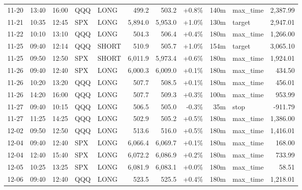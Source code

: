 \documentclass[11pt,a4paper,twoside]{article}
\begin{document}
\begin{center}
\begin{longtable}{>{\color{txtmain}}l l l l l r r r r >{\color{txtmain}}l r}
11-20 & 13:40 & 16:00 & QQQ & LONG & 499.2 & 503.2 & \textcolor{wingreen}{+0.8\%} & 140m & max\_time & \textcolor{wingreen}{2,387.99} \\
11-21 & 10:35 & 12:45 & SPX & LONG & 5,894.0 & 5,953.0 & \textcolor{wingreen}{+1.0\%} & 130m & target & \textcolor{wingreen}{2,947.01} \\
11-22 & 10:10 & 13:10 & QQQ & LONG & 504.3 & 506.4 & \textcolor{wingreen}{+0.4\%} & 180m & max\_time & \textcolor{wingreen}{1,266.00} \\
11-25 & 09:40 & 12:14 & QQQ & SHORT & 510.9 & 505.7 & \textcolor{wingreen}{+1.0\%} & 154m & target & \textcolor{wingreen}{3,065.10} \\
11-25 & 09:50 & 12:50 & SPX & SHORT & 6,011.9 & 5,973.4 & \textcolor{wingreen}{+0.6\%} & 180m & max\_time & \textcolor{wingreen}{1,924.01} \\
11-26 & 09:40 & 12:40 & SPX & LONG & 6,000.3 & 6,009.0 & \textcolor{wingreen}{+0.1\%} & 180m & max\_time & \textcolor{wingreen}{434.50} \\
11-26 & 10:20 & 13:20 & QQQ & LONG & 507.7 & 508.5 & \textcolor{wingreen}{+0.1\%} & 180m & max\_time & \textcolor{wingreen}{456.01} \\
11-26 & 14:20 & 16:00 & QQQ & LONG & 507.7 & 509.3 & \textcolor{wingreen}{+0.3\%} & 100m & max\_time & \textcolor{wingreen}{953.99} \\
11-27 & 09:40 & 10:15 & QQQ & LONG & 506.5 & 505.0 & \textcolor{lossred}{-0.3\%} & 35m & stop & \textcolor{lossred}{-911.79} \\
11-27 & 11:25 & 14:25 & QQQ & LONG & 502.9 & 505.2 & \textcolor{wingreen}{+0.5\%} & 180m & max\_time & \textcolor{wingreen}{1,386.00} \\
12-02 & 09:50 & 12:50 & QQQ & LONG & 513.6 & 516.0 & \textcolor{wingreen}{+0.5\%} & 180m & max\_time & \textcolor{wingreen}{1,416.01} \\
12-04 & 09:40 & 12:40 & SPX & LONG & 6,066.4 & 6,069.7 & \textcolor{wingreen}{+0.1\%} & 180m & max\_time & \textcolor{wingreen}{168.00} \\
12-04 & 12:40 & 15:40 & SPX & LONG & 6,072.2 & 6,086.9 & \textcolor{wingreen}{+0.2\%} & 180m & max\_time & \textcolor{wingreen}{733.99} \\
12-05 & 10:25 & 13:25 & SPX & LONG & 6,081.9 & 6,083.1 & \textcolor{wingreen}{+0.0\%} & 180m & max\_time & \textcolor{wingreen}{58.51} \\
12-06 & 09:40 & 12:40 & QQQ & LONG & 523.5 & 525.5 & \textcolor{wingreen}{+0.4\%} & 180m & max\_time & \textcolor{wingreen}{1,218.01} \\

\end{longtable}
\end{center}
\end{document}

